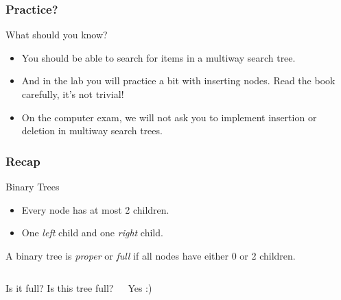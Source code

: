 \begin{frame}
	\frametitle{Practice?}
	
		\begin{block}{What should you know?}
			\begin{itemize}
				\item You should be able to search for items in a multiway search tree.
				\item And in the lab you will practice a bit with inserting nodes. Read the book carefully, it's not trivial!
				\item On the computer exam, we will not ask you to implement insertion or deletion in multiway search trees.
			\end{itemize}
		\end{block}	
\end{frame}


\begin{frame}
	\frametitle{Recap}
	
		\begin{block}{Binary Trees}
			\begin{itemize}
				\item Every node has at most 2 children.
					\pause
				\item One \textit{left} child and one \textit{right} child.
			\end{itemize}
		\pause
		A binary tree is \textit{proper} or \textit{full} if all nodes have either 0 or 2 children.
		\end{block}	
		\pause
		\begin{columns}
				
				
			\begin{block}{Is it full?}
				Is this tree full?
			\end{block}
			\begin{block}{}
				Yes :)	
			\end{block}
		\end{columns}
\end{frame}


